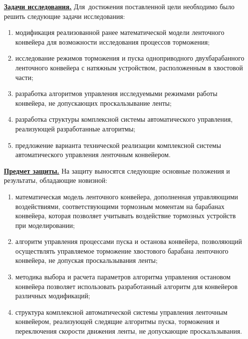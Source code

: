 \underline{\textbf{Задачи исследования.}} Для~достижения поставленной цели необходимо было решить следующие задачи исследования: 
\begin{enumerate}
	\item модификация реализованной ранее математической модели ленточного конвейера для возможности исследования процессов торможения;
	\item исследование режимов торможения и пуска одноприводного двухбарабанного ленточного конвейера с натяжным устройством, расположенным в хвостовой части;
	\item разработка алгоритмов управления исследуемыми режимами работы конвейера, не допускающих проскальзывание ленты;
	\item разработка структуры комплексной системы автоматического управления, реализующей разработанные алгоритмы;
	\item предложение варианта технической реализации комплексной системы автоматического управления ленточным конвейером.
\end{enumerate}
\bigskip

\fi

\underline{\textbf{Предмет защиты.}} На защиту выносятся следующие основные положения и результаты, обладающие новизной:
\begin{enumerate}
	\item математическая модель ленточного конвейера, дополненная управляющими воздействиями, соответствующими тормозным моментам на барабанах конвейера, которая позволяет учитывать воздействие тормозных устройств при моделировании;
	\item алгоритм управления процессами пуска и останова конвейера, позволяющий осуществлять управляемое торможение хвостового барабана ленточного конвейера, не допуская проскальзывания ленты;
	\item методика выбора и расчета параметров алгоритма управления остановом конвейера позволяет использовать разработанный алгоритм для конвейеров различных модификаций;
	\item структура комплексной автоматической системы управления ленточным конвейером, реализующей следящие алгоритмы пуска, торможения и переключения скорости движения ленты, не допускающие проскальзывания.
\end{enumerate}
\bigskip

